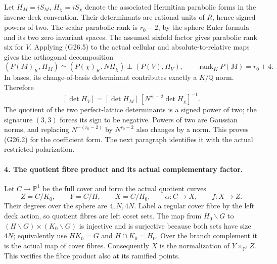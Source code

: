 Let \(H_M=iS_M\), \(H_\chi=iS_\chi\) denote the associated
Hermitian parabolic forms in the inverse-deck convention.
Their determinants are rational units of \(R\), hence signed
powers of two. The scalar parabolic rank is \(r_0-2\),
by the sphere Euler formula and its two zero invariant spaces.
The assumed sixfold factor gives parabolic rank six for \(V\).
Applying (G26.5) to the actual cellular and absolute-to-relative
maps gives the orthogonal decomposition
\[
 (P(M)_K,H_M)\simeq
          (P(\chi)_K,NH_\chi)\perp(P(V),H_V),
 \qquad \operatorname{rank}_KP(M)=r_0+4.                 \tag{G26.8}
\]
In bases, its change-of-basis determinant contributes exactly a
\(K/\mathbb Q\) norm. Therefore
\[
 [\det H_V]=[\det H_M]\,
            [N^{r_0-2}\det H_\chi]^{-1}.                \tag{G26.9}
\]
The quotient of the two perfect-lattice determinants is a signed
power of two; the signature \((3,3)\) forces its sign to be
negative. Powers of two are Gaussian norms, and replacing
\(N^{-(r_0-2)}\) by \(N^{r_0-2}\) also changes by a norm.
This proves (G26.2) for the coefficient form. The next paragraph
identifies it with the actual restricted polarization.

\paragraph{4. The quotient fibre product and its actual complementary factor.}
Let \(C\to\mathbb P^1\) be the full cover and form the
actual quotient curves
\[
 Z=C/K_0,\qquad Y=C/H,\qquad X=C/H_0,\qquad
 \alpha:C\to X,\qquad f:X\to Z.                          \tag{G26.10}
\]
Their degrees over the sphere are \(4,N,4N\). Label a
regular cover fibre by the left deck action, so quotient
fibres are left coset sets. The map
from \(H_0\backslash G\) to
\((H\backslash G)\times(K_0\backslash G)\) is injective
and is surjective because both sets have size \(4N\);
equivalently use \(HK_0=G\) and \(H\cap K_0=H_0\).
Over the branch complement it is the actual map of cover
fibres. Consequently \(X\) is the normalization of
\(Y\times_{\mathbb P^1}Z\). This verifies the fibre product
also at its ramified points.

